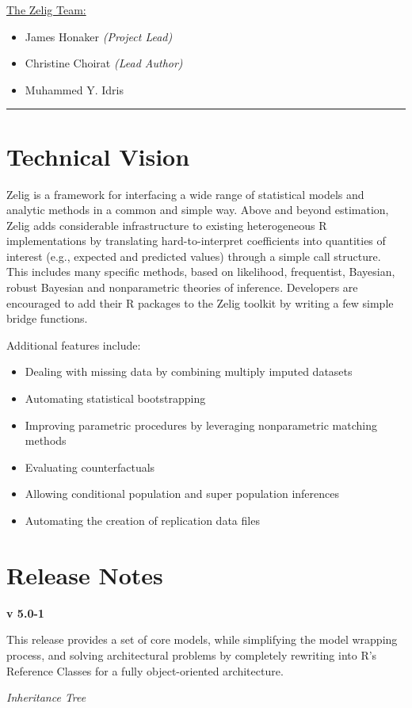 \documentclass[letterpaper,10pt,english]{sphinxmanual}
\begin{document}
\href{http://datascience.iq.harvard.edu/team}{The Zelig Team:}
\begin{itemize}
\item {} 
James Honaker \emph{(Project Lead)}

\item {} 
Christine Choirat \emph{(Lead Author)}

\item {} 
Muhammed Y. Idris

\end{itemize}


\bigskip\hrule{}\bigskip



\section{Technical Vision}
\label{about:technical-vision}
Zelig is a framework for interfacing a wide range of statistical models and analytic methods in a common and simple way. Above and beyond estimation, Zelig adds considerable infrastructure to existing heterogeneous R implementations by translating hard-to-interpret coefficients into quantities of interest (e.g., expected and predicted values) through a simple call structure. This includes many specific methods, based on likelihood, frequentist, Bayesian, robust Bayesian and nonparametric theories of inference. Developers are encouraged to add their R packages to the Zelig toolkit by writing a few simple bridge functions.

Additional features include:
\begin{itemize}
\item {} 
Dealing with missing data by combining multiply imputed datasets

\item {} 
Automating statistical bootstrapping

\item {} 
Improving parametric procedures by leveraging nonparametric matching methods

\item {} 
Evaluating counterfactuals

\item {} 
Allowing conditional population and super population inferences

\item {} 
Automating the creation of replication data files

\end{itemize}


\section{Release Notes}
\label{about:release-notes}
\textbf{v 5.0-1}

This release provides a set of core models, while simplifying the model wrapping process, and solving architectural problems by completely rewriting into R’s Reference Classes for a fully object-oriented architecture.

\emph{Inheritance Tree}



\renewcommand{\indexname}{Index}
\printindex
\end{document}
